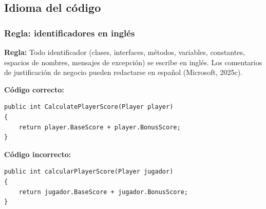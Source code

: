 \subsection{Idioma del código}

\subsubsection{Regla: identificadores en inglés}

\textbf{Regla:} Todo identificador (clases, interfaces, métodos, variables, constantes, espacios de nombres, mensajes de excepción) se escribe en inglés. Los comentarios de justificación de negocio pueden redactarse en español (Microsoft, 2025c).

\textbf{Código correcto:}
\begin{lstlisting}[style=csharpstyle]
public int CalculatePlayerScore(Player player)
{
    return player.BaseScore + player.BonusScore;
}
\end{lstlisting}

\textbf{Código incorrecto:}
\begin{lstlisting}[style=csharpstyle]
public int calcularPlayerScore(Player jugador)
{
    return jugador.BaseScore + jugador.BonusScore;
}
\end{lstlisting}
